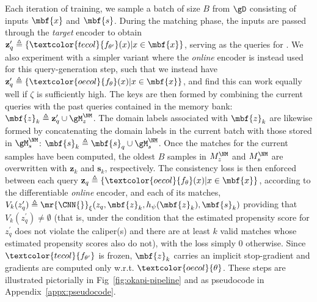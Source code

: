 Each iteration of training, we sample a batch of size $B$ from $\gD$ consisting of inputs $\mbf{x}$
and $\mbf{s}$.
%
During the matching phase, the inputs are passed through the \emph{target} encoder to obtain
$\mathbf{z}_q^\prime \triangleq \{ \textcolor{tecol}{f_{\theta^\prime} } (x) | x \in \mbf{x}\}$,
serving as the queries for \CNN{}.
%
We also experiment with a simpler variant where the \emph{online} encoder is instead used for this
query-generation step, such that we instead have $\mathbf{z}_q^\prime \triangleq
\{\textcolor{oecol}{f_{\theta}}(x) | x \in \mbf{x}\}$, and find this can work equally well if
$\zeta$ is sufficiently high.
%
The keys are then formed by combining the current queries with the past queries contained in the
memory bank: $\mbf{z}_k\triangleq \mathbf{z}_q^\prime \cup \gM^{\NM}_z$.
%
The domain labels associated with $\mbf{z}_k$ are likewise formed by concatenating the domain
labels in the current batch with those stored in $\gM^{\NM}_s$: $\mbf{s}_k \triangleq \mbf{s}_q \cup
\gM^{\NM}_s$.
%
Once the matches for the current samples have been computed, the oldest $B$ samples in $M^{\NM}_z$
and $M^{\NM}_s$ are overwritten with $\mathbf{z}_k$ and $\mathbf{s}_k$, respectively.
%
The consistency loss is then enforced between each query $\mathbf{z}_q \triangleq \{
  \textcolor{oecol}{f_{\theta}}(x) |
x \in \mbf{x}\} $, according to the differentiable \emph{online} encoder, and each of its matches,
$V_k(z_q^\prime) \triangleq \mr{\CNN{}}_\xi(z_q, \mbf{z}_k, h_\psi(\mbf{z}_k), \mbf{s}_k)$ providing
that $V_k(z_q^\prime) \neq \emptyset$ (that is, under the condition that the estimated propensity
score for $z_q^\prime$ does not violate the caliper(s) and there are at least $k$ valid matches
whose estimated propensity scores also do not), with the loss simply $0$ otherwise.
%
Since $\textcolor{tecol}{ f_{\theta^\prime} }$ is frozen, $\mbf{z}_k$ carries an implicit
stop-gradient and gradients are computed only w.r.t. $\textcolor{oecol}{ \theta}$.
%
These steps are illustrated pictorially in Fig~\ref{fig:okapi-pipeline} and as pseudocode in
Appendix~\ref{appx:pseudocode}.

